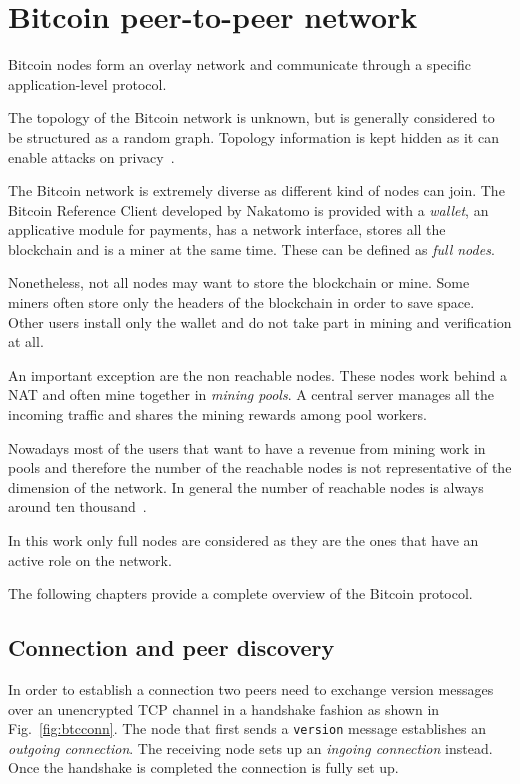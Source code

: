 \chapter{Bitcoin peer-to-peer network}
\label{sec:netintro}

Bitcoin nodes form an overlay network and communicate through a specific application-level protocol.

The topology of the Bitcoin network is unknown, but is generally considered to be structured as a random graph. Topology information is kept hidden as it can enable attacks on privacy~\cite{biryukov2014deanonymisation}.
~\cite{Deshpande2018BTCmapMB}\par

The Bitcoin network is extremely diverse as different kind of nodes can join. The Bitcoin Reference Client developed by Nakatomo is provided with a \textit{wallet}, an applicative module for payments, has a network interface, stores all the blockchain and is a miner at the same time. These can be defined as \textit{full nodes}.

Nonetheless, not all nodes may want to store the blockchain or mine. Some miners often store only the headers of the blockchain in order to save space. Other users install only the wallet and do not take part in mining and verification at all.

An important exception are the non reachable nodes. These nodes work behind a NAT and often mine together in \textit{mining pools}. A central server manages all the incoming traffic and shares the mining rewards among pool workers.

Nowadays most of the users that want to have a revenue from mining work in pools and therefore the number of the reachable nodes is not representative of the dimension of the network. In general the number of reachable nodes is always around ten thousand~\cite{totknownfullnodes}.\par

In this work only full nodes are considered as they are the ones that have an active role on the network.

The following chapters provide a complete overview of the Bitcoin protocol.

\section{Connection and peer discovery}\label{sec:peerdisc}
In order to establish a connection two peers need to exchange version messages over an unencrypted TCP channel in a handshake fashion as shown in Fig.~\ref{fig:btcconn}. The node that first sends a \texttt{version} message establishes an \emph{outgoing connection}. The receiving node sets up an \emph{ingoing connection} instead. Once the handshake is completed the connection is fully set up.

